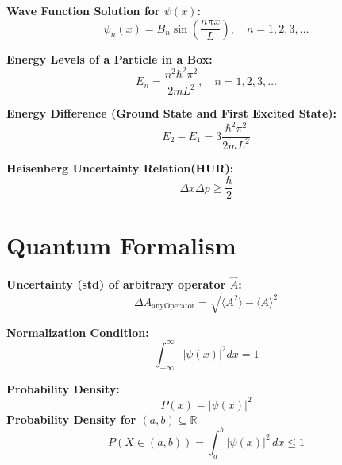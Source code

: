 \documentclass[a4paper,11pt]{article}
\renewcommand{\textbf}[1]{{\scriptsize	\bfseries #1}}
\begin{document}
\begin{footnotesize}
\begin{multicols}{2}
\begin{minipage}{\linewidth}
\textbf{Wave Function Solution for \(\psi(x)\):}
\[
\psi_n(x) = B_n \sin\left(\frac{n\pi x}{L}\right), \quad n = 1, 2, 3, \dots
\]
\end{minipage}



\begin{minipage}{\linewidth}
\textbf{Energy Levels of a Particle in a Box:}
\[
E_n = \frac{n^2 \hbar^2 \pi^2}{2mL^2}, \quad n = 1, 2, 3, \dots
\]
\end{minipage}



\begin{minipage}{\linewidth}
\textbf{Energy Difference (Ground State and First Excited State):}
\[
E_2 - E_1 = 3 \frac{\hbar^2 \pi^2}{2mL^2}
\]
\end{minipage}



\begin{minipage}{\linewidth}
\textbf{Heisenberg Uncertainty Relation(HUR):}
\[
\Delta x \Delta p \geq \frac{\hbar}{2}
\]
\end{minipage}



\section*{Quantum Formalism}

\begin{minipage}{\linewidth}
\textbf{Uncertainty (std) of arbitrary operator \( \hat{A} \):}
\[
\Delta A_{\text{anyOperator}} = \sqrt{\langle A^2 \rangle - \langle A \rangle^2}
\]

\end{minipage}


\begin{minipage}{\linewidth}

\textbf{Normalization Condition:} \\[-0.2cm]
\[
\int_{-\infty}^{\infty} |\psi(x)|^2 dx = 1
\]

\end{minipage}


\begin{minipage}{\linewidth}

\textbf{Probability Density:} \\[-0.2cm]
\[
P(x) = |\psi(x)|^2
\]
\textbf{Probability Density for  $(a, b) \subseteq \mathbb{R}$} \\[-0.2cm]
\[
P(X \in (a, b)) = \int_a^b |\psi(x)|^2 \, dx \leq 1
\]


\end{minipage}
\end{multicols}
\end{footnotesize}
\end{document}
